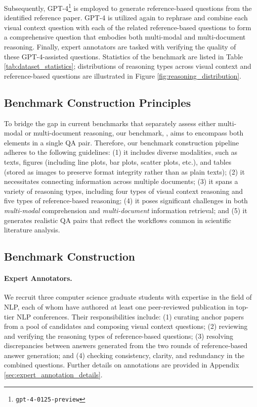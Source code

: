 %
Subsequently, GPT-4\footnote{\texttt{gpt-4-0125-preview}}
is employed to generate reference-based questions from the identified reference paper. 
%
GPT-4 is utilized again to rephrase and combine each visual context question with each of the related reference-based questions to form a comprehensive question that embodies both multi-modal and multi-document reasoning.
%
Finally, expert annotators are tasked with verifying the quality of these GPT-4-assisted questions.
% 
Statistics of the benchmark are listed in Table \ref{tab:dataset_statistics}; 
%
distributions of reasoning types across visual context and reference-based questions are illustrated in Figure \ref{fig:reasoning_distribution}.




\subsection{Benchmark Construction Principles}


To bridge the gap in current benchmarks that separately assess either multi-modal or multi-document reasoning, our benchmark, \data, aims to encompass both elements in a single QA pair. 
%
Therefore, our benchmark construction pipeline adheres to the following guidelines:
%
(1) it includes diverse modalities, such as texts, figures (including line plots, bar plots, scatter plots, etc.), and tables (stored as images to preserve format integrity rather than as plain texts); 
%
(2) it necessitates connecting information across multiple documents; 
%
(3) it spans a variety of reasoning types, including four types of visual context reasoning and five types of reference-based reasoning;
%
(4) it poses significant challenges in both \emph{multi-modal} comprehension and \emph{multi-document} information retrieval; and 
%
(5) it generates realistic QA pairs that reflect the workflows common in scientific literature analysis.


\subsection{Benchmark Construction}
\label{sec:benchmark_construction}

\paragraph{Expert Annotators.}
We recruit three computer science graduate students with expertise in the field of NLP, each of whom have authored at least one peer-reviewed publication in top-tier NLP conferences. 
%
Their responsibilities include: 
%
(1) curating anchor papers from a pool of candidates and composing visual context questions; 
%
(2) reviewing and verifying the reasoning types of reference-based questions; 
%
(3) resolving discrepancies between answers generated from the two rounds of reference-based answer generation; 
%
and (4) checking consistency, clarity, and redundancy in the combined questions. 
%
Further details on annotations are provided in Appendix \ref{sec:expert_annotation_details}.

